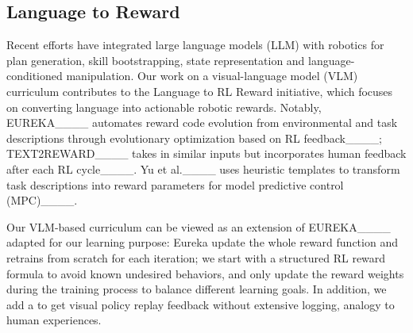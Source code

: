 \subsection{Language to Reward}
Recent efforts have integrated large language models (LLM) with robotics for plan generation, skill bootstrapping, state representation and language-conditioned manipulation. Our work on a visual-language model (VLM) curriculum contributes to the Language to RL Reward initiative, which focuses on converting language into actionable robotic rewards. Notably, EUREKA____ automates reward code evolution from environmental and task descriptions through evolutionary optimization based on RL feedback____; TEXT2REWARD____ takes in similar inputs but incorporates human feedback after each RL cycle____. 
Yu et al.____ uses heuristic templates to transform task descriptions into reward parameters for model predictive control (MPC)____.

Our VLM-based curriculum can be viewed as an extension of EUREKA____ adapted for our learning purpose: Eureka  update the whole reward function and retrains from scratch for each iteration; we start with a structured RL reward formula to avoid known undesired behaviors, and only update the reward weights during the training process to balance different learning goals. In addition, we add a  to get visual policy replay feedback without extensive logging, analogy to human experiences. 







